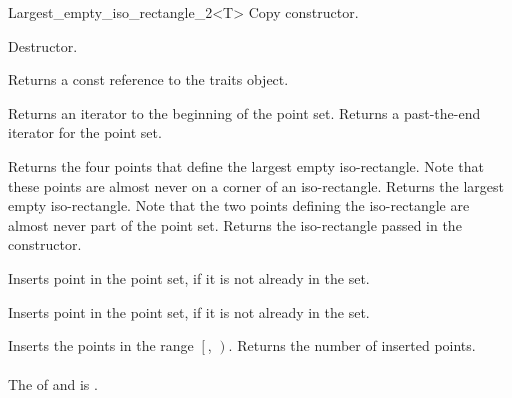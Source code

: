 \begin{ccRefClass}{Largest_empty_iso_rectangle_2<T>}
{Copy constructor.} 

{Destructor.}

\ccOperations
{}


{}



\ccAccessFunctions

{Returns a const reference to the traits object.}


{Returns an iterator to the beginning of the point set.}
{Returns a past-the-end iterator for the point set.}



{Returns the four points that define the largest empty iso-rectangle.
Note that these points are almost never on a corner of an iso-rectangle.}
\ccGlue
{}
{Returns the largest empty iso-rectangle. Note that the two
points defining the iso-rectangle are almost never part of 
the point set.}
\ccGlue
{}
{Returns  the iso-rectangle passed in the constructor.}


{Inserts point  in the point set, if it is not already in the set.}

{Inserts point  in the point set, if it is not already in the set.}


{Inserts the points in the range $\left[\right.$,
$\left.\right)$.  Returns the number of inserted points. \\ \\
\ccRequirements The  of  and  is .}



\end{ccRefClass}
